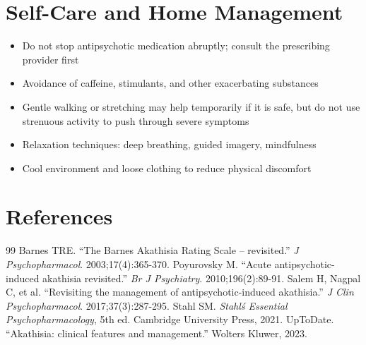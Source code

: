 \section*{Self-Care and Home Management}
\begin{itemize}
 \item Do not stop antipsychotic medication abruptly; consult the prescribing provider first
 \item Avoidance of caffeine, stimulants, and other exacerbating substances
 \item Gentle walking or stretching may help temporarily if it is safe, but do not use strenuous activity to push through severe symptoms
 \item Relaxation techniques: deep breathing, guided imagery, mindfulness
 \item Cool environment and loose clothing to reduce physical discomfort
\end{itemize}

\section*{References}
\begin{thebibliography}{99}
 Barnes TRE. ``The Barnes Akathisia Rating Scale -- revisited.'' \textit{J Psychopharmacol}. 2003;17(4):365-370.
 Poyurovsky M. ``Acute antipsychotic-induced akathisia revisited.'' \textit{Br J Psychiatry}. 2010;196(2):89-91.
 Salem H, Nagpal C, et al. ``Revisiting the management of antipsychotic-induced akathisia.'' \textit{J Clin Psychopharmacol}. 2017;37(3):287-295.
 Stahl SM. \textit{Stahl\'s Essential Psychopharmacology}, 5th ed. Cambridge University Press, 2021.
 UpToDate. ``Akathisia: clinical features and management.'' Wolters Kluwer, 2023.
\end{thebibliography}
